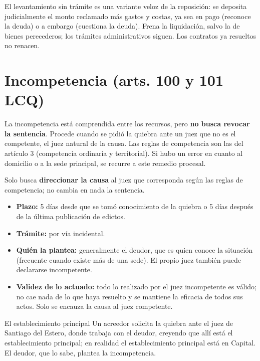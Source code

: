 \documentclass[12pt,oneside]{book}
\begin{document}
\begin{important}
El levantamiento sin trámite es una variante veloz de la reposición: se deposita judicialmente el monto reclamado más gastos y costas, ya sea en pago (reconoce la deuda) o a embargo (cuestiona la deuda). Frena la liquidación, salvo la de bienes perecederos; los trámites administrativos siguen. Los contratos ya resueltos no renacen.
\end{important}

\section{Incompetencia (arts. 100 y 101 LCQ)}

La incompetencia está comprendida entre los recursos, pero \textbf{no busca revocar la sentencia}. Procede cuando se pidió la quiebra ante un juez que no es el competente, el juez natural de la causa. Las reglas de competencia son las del artículo 3 (competencia ordinaria y territorial). Si hubo un error en cuanto al domicilio o a la sede principal, se recurre a este remedio procesal.

Solo busca \textbf{direccionar la causa} al juez que corresponda según las reglas de competencia; no cambia en nada la sentencia.

\begin{itemize}
    \item \textbf{Plazo:} 5 días desde que se tomó conocimiento de la quiebra o 5 días después de la última publicación de edictos.
    \item \textbf{Trámite:} por vía incidental.
    \item \textbf{Quién la plantea:} generalmente el deudor, que es quien conoce la situación (frecuente cuando existe más de una sede). El propio juez también puede declararse incompetente.
    \item \textbf{Validez de lo actuado:} todo lo realizado por el juez incompetente es válido; no cae nada de lo que haya resuelto y se mantiene la eficacia de todos sus actos. Solo se encauza la causa al juez competente.
\end{itemize}

\begin{example}{El establecimiento principal}
Un acreedor solicita la quiebra ante el juez de Santiago del Estero, donde trabaja con el deudor, creyendo que allí está el establecimiento principal; en realidad el establecimiento principal está en Capital. El deudor, que lo sabe, plantea la incompetencia.
\end{example}
\end{document}
